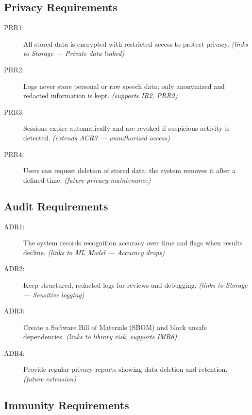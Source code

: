 \documentclass{article}
\begin{document}
\subsection{Privacy Requirements}

\begin{description}
  \item[PRR1:] All stored data is encrypted with restricted access to protect privacy. \emph{(links to Storage — Private data leaked)}
  \item[PRR2:] Logs never store personal or raw speech data; only anonymized and redacted information is kept. \emph{(supports IR2, PRR2)}
  \item[PRR3:] Sessions expire automatically and are revoked if suspicious activity is detected. \emph{(extends ACR3 — unauthorized access)}
  \item[PRR4:] Users can request deletion of stored data; the system removes it after a defined time. \emph{(future privacy maintenance)}
\end{description}

\subsection{Audit Requirements}

\begin{description}
  \item[ADR1:] The system records recognition accuracy over time and flags when results decline. \emph{(links to ML Model — Accuracy drops)}
  \item[ADR2:] Keep structured, redacted logs for reviews and debugging. \emph{(links to Storage — Sensitive logging)}
  \item[ADR3:] Create a Software Bill of Materials (SBOM) and block unsafe dependencies. \emph{(links to library risk, supports IMR6)}
  \item[ADR4:] Provide regular privacy reports showing data deletion and retention. \emph{(future extension)}
\end{description}

\subsection{Immunity Requirements}
\end{document}
